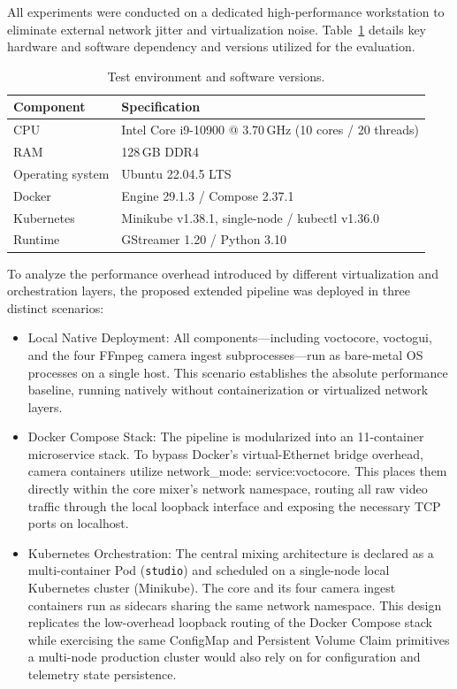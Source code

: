 \documentclass[electronics,article,submit,pdftex,moreauthors]{Definitions/mdpi}
\begin{document}
All experiments were conducted on a dedicated high-performance workstation to eliminate external network jitter and virtualization noise. Table~\ref{tab:testenv} details key hardware and software dependency and versions utilized for the evaluation.

\begin{table}[H]
\caption{Test environment and software versions.\label{tab:testenv}}
\begin{tabularx}{\textwidth}{lX}
\toprule
\textbf{Component} & \textbf{Specification}\\
\midrule
CPU              & Intel Core i9-10900 @ 3.70\,GHz (10 cores / 20 threads)\\
RAM              & 128\,GB DDR4\\
Operating system & Ubuntu 22.04.5 LTS\\
Docker           & Engine 29.1.3 / Compose 2.37.1\\
Kubernetes       & Minikube v1.38.1, single-node / kubectl v1.36.0\\
Runtime          & GStreamer 1.20 / Python 3.10\\
\bottomrule
\end{tabularx}
\end{table}

To analyze the performance overhead introduced by different virtualization and orchestration layers, the proposed extended pipeline was deployed in three distinct scenarios:

\begin{itemize}
    \item Local Native Deployment: All components—including voctocore, voctogui, and the four FFmpeg camera ingest subprocesses—run as bare-metal OS processes on a single host. This scenario establishes the absolute performance baseline, running natively without containerization or virtualized network layers.
    \item Docker Compose Stack: The pipeline is modularized into an 11-container microservice stack. To bypass Docker's virtual-Ethernet bridge overhead, camera containers utilize network\_mode: service:voctocore. This places them directly within the core mixer’s network namespace, routing all raw video traffic through the local loopback interface and exposing the necessary TCP ports on localhost.
    \item Kubernetes Orchestration: The central mixing architecture is declared as a multi-container Pod (\texttt{studio}) and scheduled on a single-node local Kubernetes cluster (Minikube). The core and its four camera ingest containers run as sidecars sharing the same network namespace. This design replicates the low-overhead loopback routing of the Docker Compose stack while exercising the same ConfigMap and Persistent Volume Claim primitives a multi-node production cluster would also rely on for configuration and telemetry state persistence.
\end{itemize}
\end{document}

